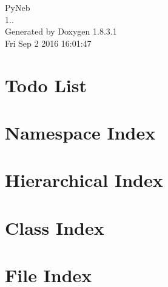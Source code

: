 \documentclass{book}
\begin{document}
\hypersetup{pageanchor=false,citecolor=blue}
\begin{titlepage}
\vspace*{7cm}
\begin{center}
{\Large Py\-Neb \\[1ex]\large 1.. }\\
\vspace*{1cm}
{\large Generated by Doxygen 1.8.3.1}\\
\vspace*{0.5cm}
{\small Fri Sep 2 2016 16:01:47}\\
\end{center}
\end{titlepage}
\clearemptydoublepage
{}
\tableofcontents
\clearemptydoublepage
{}
\hypersetup{pageanchor=true,citecolor=blue}
\chapter{Todo List}
\label{todo}
\hypertarget{todo}{}

\chapter{Namespace Index}

\chapter{Hierarchical Index}

\chapter{Class Index}

\chapter{File Index}

\end{document}
